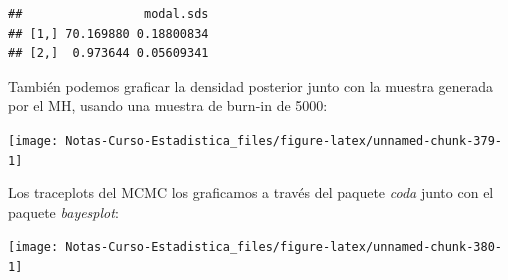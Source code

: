\documentclass[
  12pt,
]{book}
\newenvironment{Shaded}{\begin{snugshade}}{\end{snugshade}}
\newcommand{\AttributeTok}[1]{\textcolor[rgb]{0.77,0.63,0.00}{#1}}
\newcommand{\CommentTok}[1]{\textcolor[rgb]{0.56,0.35,0.01}{\textit{#1}}}
\newcommand{\DecValTok}[1]{\textcolor[rgb]{0.00,0.00,0.81}{#1}}
\newcommand{\FloatTok}[1]{\textcolor[rgb]{0.00,0.00,0.81}{#1}}
\newcommand{\FunctionTok}[1]{\textcolor[rgb]{0.00,0.00,0.00}{#1}}
\newcommand{\NormalTok}[1]{#1}
\newcommand{\OtherTok}[1]{\textcolor[rgb]{0.56,0.35,0.01}{#1}}
\newcommand{\SpecialCharTok}[1]{\textcolor[rgb]{0.00,0.00,0.00}{#1}}
\newcommand{\StringTok}[1]{\textcolor[rgb]{0.31,0.60,0.02}{#1}}
\theoremstyle{definition}
\theoremstyle{definition}
\theoremstyle{definition}
\theoremstyle{definition}
\theoremstyle{remark}
\begin{document}
\begin{verbatim}
##                 modal.sds
## [1,] 70.169880 0.18800834
## [2,]  0.973644 0.05609341
\end{verbatim}

También podemos graficar la densidad posterior junto con la muestra generada por el MH, usando una muestra de burn-in de 5000:

\begin{Shaded}
\end{Shaded}

\begin{center}\texttt{[image: Notas-Curso-Estadistica\_files/figure-latex/unnamed-chunk-379-1]} \end{center}

Los traceplots del MCMC los graficamos a través del paquete \emph{coda} junto con el paquete \emph{bayesplot}:

\begin{Shaded}
\end{Shaded}

\begin{center}\texttt{[image: Notas-Curso-Estadistica\_files/figure-latex/unnamed-chunk-380-1]} \end{center}
\end{document}
